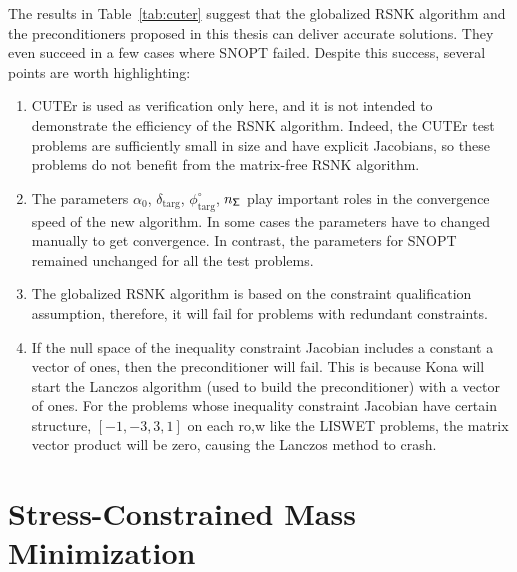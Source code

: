 The results in Table~\ref{tab:cuter} suggest 
that the globalized RSNK algorithm and the preconditioners proposed in this thesis can deliver accurate solutions. They even succeed in a few cases where SNOPT failed. Despite this success, several points are worth highlighting:
\begin{enumerate}
\item CUTEr is used as verification only here, and it is not intended to demonstrate the efficiency of the RSNK algorithm.  Indeed, the CUTEr test problems are sufficiently small in size and have explicit Jacobians, so these problems do not benefit from the matrix-free RSNK algorithm.

\item The parameters \textbf{$\alpha_0$},  $\delta_{\text{targ}}$, $\phi^{\circ}_{\text{targ}}$,  $n_{\mathsf{\Sigma}}$ play important roles in the convergence speed of the new algorithm. In some cases the parameters have to changed manually to get convergence. In contrast, the parameters for SNOPT remained unchanged for all the test problems. 
\item The globalized RSNK algorithm is based on the constraint qualification assumption, therefore, it will fail for problems with redundant constraints.    
\item If the null space of the inequality constraint Jacobian includes a constant   a vector of ones, then the preconditioner will fail. This is because Kona will start the Lanczos algorithm (used to build the preconditioner) with a vector of ones.
 For the problems whose inequality constraint Jacobian have certain structure, \eg $[-1, -3, 3, 1]$ on each ro,w like the LISWET problems, the matrix vector product will be zero, causing the Lanczos method to crash. 
\end{enumerate} 



\newpage

\section{Stress-Constrained Mass Minimization}\label{sec:fstopo2}
